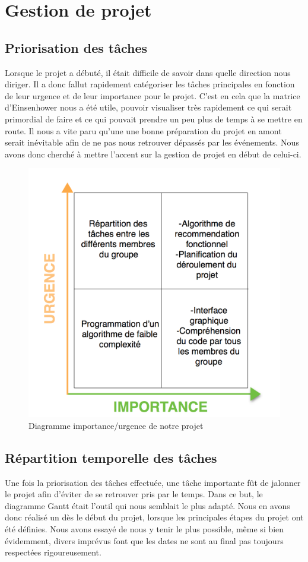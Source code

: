 \documentclass[light]{ceri}
\begin{document}
\section{Gestion de projet}  
\subsection{Priorisation des tâches}
Lorsque le projet a débuté, il était difficile de savoir dans quelle direction nous diriger. Il a donc fallut rapidement catégoriser les tâches principales en fonction de leur urgence et de leur importance pour le projet. C'est en cela que la matrice d'Einsenhower nous a été utile, pouvoir visualiser très rapidement ce qui serait primordial de faire et ce qui pouvait prendre un peu plus de temps à se mettre en route. Il nous a vite paru qu'une une bonne préparation du projet en amont serait inévitable afin de ne pas nous retrouver dépassés par les événements. Nous avons donc cherché à mettre l'accent sur la gestion de projet en début de celui-ci.



\begin{figure}[!h]
\centering\includegraphics[width=13cm]{images/EISENHOWER.png}
\caption{Diagramme importance/urgence de notre projet}
\end{figure}
\newpage

\subsection{Répartition temporelle des tâches}
Une fois la priorisation des tâches effectuée, une tâche importante fût de jalonner le projet afin d'éviter de se retrouver pris par le temps. Dans ce but, le diagramme Gantt était l'outil qui nous semblait le plus adapté. Nous en avons donc réalisé un dès le début du projet, lorsque les principales étapes du projet ont été définies. Nous avons essayé de nous y tenir le plus possible, même si bien évidemment, divers imprévus font que les dates ne sont au final pas toujours respectées rigoureusement.
\end{document}
